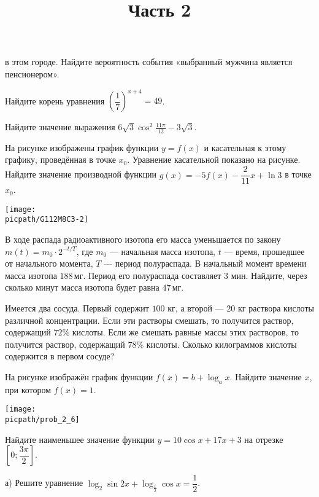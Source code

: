 \begin{training}[2]
\begin{listofex}
		в этом городе. Найдите вероятность события «выбранный мужчина является пенсионером».
		\foranswer
		\item Найдите корень уравнения \(\left( \dfrac{1}{7} \right)^{x+4}=49 \).
		\hphantom{Часть 1}
		\item 
		Найдите значение выражения \(6\sqrt{3}\cos^2\frac{11\pi}{12}-3\sqrt{3}\).
		\foranswer
		\item
		\begin{minipage}[t]{\bodywidth}
			На рисунке изображены график функции \(y=f(x)\) и касательная к этому графику, проведённая в точке \(x_0\). Уравнение касательной показано на рисунке. Найдите значение производной функции \(g(x)=-5f(x)-\dfrac{ 2 }{ 11 }x+\ln3\) в точке \(x_0\).
			\foranswer
		\end{minipage}
		\gapwidth
		\begin{minipage}[t]{\picwidth}
			\texttt{[image: \\picpath/G112M8C3-2]}
		\end{minipage}
		\item В ходе распада радиоактивного изотопа его масса уменьшается по закону \( m(t)=m_0\cdot2^{-t/T} \), где \( m_0 \) --- начальная масса изотопа, \( t \) --- время, прошедшее от начального момента, \( T \) --- период полураспада. В начальный момент времени масса изотопа \( 188 \) мг. Период его полураспада составляет \( 3 \) мин. Найдите, через сколько минут масса изотопа будет равна \( 47 \) мг.
		\foranswer
		\item Имеется два сосуда. Первый содержит \( 100 \) кг, а второй --- \( 20 \) кг раствора кислоты различной концентрации. Если эти растворы смешать, то получится раствор, содержащий \( 72\% \) кислоты. Если же смешать равные массы этих растворов, то получится раствор, содержащий \( 78\% \) кислоты. Сколько килограммов кислоты содержится в первом сосуде?
		\foranswer
		\newpage
		\item 
		На рисунке изображён график функции \( f(x)=b+\log_ax \). Найдите значение \( x \), при котором \( f(x)=1 \).
		\begin{center}
			\texttt{[image: \\picpath/prob\_2\_6]}
		\end{center}
		\foranswer
		\item Найдите наименьшее значение функции \( y=10\cos x+17x+3 \) на отрезке \( \left[ 0;\dfrac{3\pi}{2}\right]  \).
		\foranswer
		\egepreambtwo
		\title{Часть 2}
		\item а) Решите уравнение \( \log_2\sin2x+\log_{\frac{1}{2}}\cos x=\dfrac{1}{2} \). \\

\end{listofex}
\end{training}

